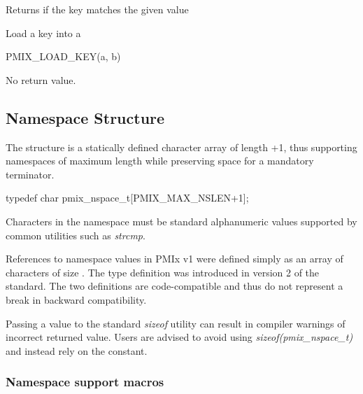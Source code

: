 Returns  if the key matches the given value


Load a key into a 

\cspecificstart
\begin{codepar}
PMIX_LOAD_KEY(a, b)
\end{codepar}
\cspecificend

\begin{arglist}
\end{arglist}

No return value.

\subsection{Namespace Structure}

The  structure is a statically defined character array of length +1, thus supporting namespaces of maximum length  while preserving space for a mandatory  terminator.

\cspecificstart
\begin{codepar}
typedef char pmix_nspace_t[PMIX_MAX_NSLEN+1];
\end{codepar}
\cspecificend

Characters in the namespace must be standard alphanumeric values supported by common utilities such as \textit{strcmp}.

\adviceuserstart
References to namespace values in \ac{PMIx} v1 were defined simply as an array of characters of size . The  type definition was introduced in version 2 of the standard. The two definitions are code-compatible and thus do not represent a break in backward compatibility.

Passing a  value to the standard \textit{sizeof} utility can result in compiler warnings of incorrect returned value. Users are advised to avoid using \textit{sizeof(pmix_nspace_t)} and instead rely on the  constant.
\adviceuserend

\subsubsection{Namespace support macros}

